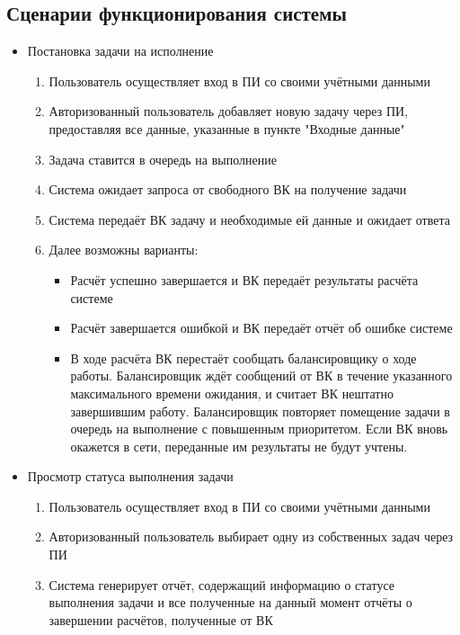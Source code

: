\documentclass[a4paper,12pt]{report}
\numberwithin{equation}{section}
\begin{document}
\subsection{Сценарии функционирования системы}
\begin{itemize}
    \item Постановка задачи на исполнение
    \begin{enumerate}
        \item Пользователь осуществляет вход в ПИ со своими учётными данными
        \item Авторизованный пользователь добавляет новую задачу через ПИ, предоставляя все данные, указанные в пункте "Входные данные"
        \item Задача ставится в очередь на выполнение
        \item Система ожидает запроса от свободного ВК на получение задачи
        \item Система передаёт ВК задачу и необходимые ей данные и ожидает ответа
        \item Далее возможны варианты:
        \begin{itemize}
            \item Расчёт успешно завершается и ВК передаёт результаты расчёта системе
            \item Расчёт завершается ошибкой и ВК передаёт отчёт об ошибке системе
            \item В ходе расчёта ВК перестаёт сообщать балансировщику о ходе работы. Балансировщик ждёт сообщений от ВК в течение указанного максимального времени ожидания, и считает ВК нештатно завершившим работу. Балансировщик повторяет помещение задачи в очередь на выполнение с повышенным приоритетом. Если ВК вновь окажется в сети, переданные им результаты не будут учтены.
        \end{itemize}
    \end{enumerate}
    
    \item Просмотр статуса выполнения задачи
    \begin{enumerate}
        \item Пользователь осуществляет вход в ПИ со своими учётными данными
        \item Авторизованный пользователь выбирает одну из собственных задач через ПИ
        \item Система генерирует отчёт, содержащий информацию о статусе выполнения задачи и все полученные на данный момент отчёты о завершении расчётов, полученные от ВК
    \end{enumerate}
    

\end{itemize}
\end{document}
